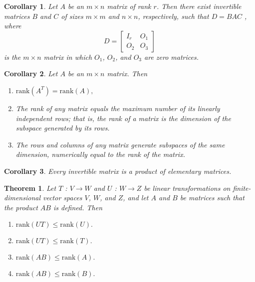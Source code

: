 \documentclass{article}
\theoremstyle{plain}
\newtheorem{theorem}{Theorem}[section]
\newtheorem{corollary}{Corollary}[section]
\begin{document}
\begin{corollary}
    Let \( A \) be an \( m \times n \) matrix of rank \( r \). Then there exist invertible matrices \( B \) and \( C \) of sizes \( m \times m \) and \( n \times n \), respectively, such that \( D = BAC \) ,
    where 
    \[
    D  =  \begin{bmatrix}
        I_r & O_1 \\
        O_2 & O_3
    \end{bmatrix}
    \]
    is the \( m \times n \) matrix in which \( O_1 \), \( O_2 \), and \( O_3 \) are zero matrices.
\end{corollary}
\vspace{7cm}

\begin{corollary}
    Let \( A \) be an \( m \times n \) matrix. Then 
    \begin{enumerate}
        \item[(a)] \(\text{rank}(A^T) = \text{rank}(A),\)
        \item[(b)] The rank of any matrix equals the maximum number of its linearly independent rows; that is, the rank of a matrix is the dimension of the subspace generated by its rows.
        \item[(c)] The rows and columns of any matrix generate subspaces of the same dimension, numerically equal to the rank of the matrix.
    \end{enumerate}
\end{corollary}
\vspace{7cm}
\begin{corollary}
    Every invertible matrix is a product of elementary matrices.
\end{corollary}
\vspace{5cm}
\begin{theorem}
    Let \( T \) : \( V \to W \) and \( U \) : \( W \to Z \) be linear transformations on finite-dimensional vector spaces \( V \), \( W \), and \( Z \), and let \( A \) and \( B \) be matrices such that the product \( AB \) is defined. Then
    \begin{enumerate}
        \item \(\text{rank}(UT) \leq \text{rank}(U).\)
        \item \(\text{rank}(UT) \leq \text{rank}(T).\)
        \item \(\text{rank}(AB) \leq \text{rank}(A).\)
        \item \(\text{rank}(AB) \leq \text{rank}(B).\)
    \end{enumerate}
\end{theorem}
\newpage
\end{document}
